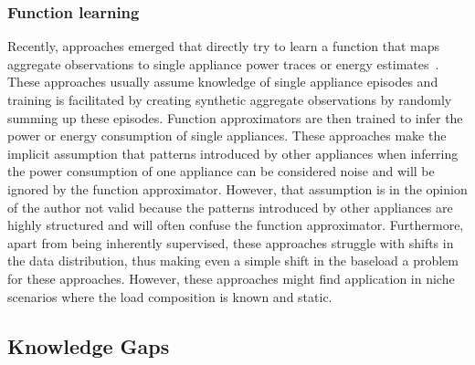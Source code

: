 \documentclass[11pt]{cmuthesis} %
\begin{document}
\subsubsection{Function learning}
Recently, approaches emerged that directly try to learn a function that maps aggregate observations to single appliance power traces or energy estimates~\cite{kelly2015neural}. These approaches usually assume knowledge of single appliance episodes and training is facilitated by creating synthetic aggregate observations by randomly summing up these episodes. Function approximators are then trained to infer the power or energy consumption of single appliances. These approaches make the implicit assumption that patterns introduced by other appliances when inferring the power consumption of one appliance can be considered noise and will be ignored by the function approximator. However, that assumption is in the opinion of the author not valid because the patterns introduced by other appliances are highly structured and will often confuse the function approximator. Furthermore, apart from being inherently supervised, these approaches struggle with shifts in the data distribution, thus making even a simple shift in the baseload a problem for these approaches. However, these approaches might find application in niche scenarios where the load composition is known and static.

\subsection{Knowledge Gaps}
\end{document}
